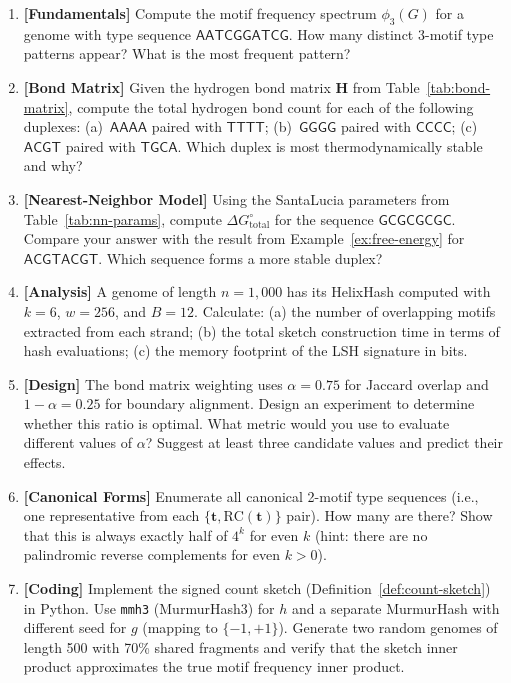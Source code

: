 \begin{enumerate}[label=\textbf{8.\arabic*.}, leftmargin=2.5em]

\item \textbf{[Fundamentals]} Compute the motif frequency spectrum $\phi_3(G)$ for a genome with type sequence $\mathsf{AATCGGATCG}$. How many distinct 3-motif type patterns appear? What is the most frequent pattern?

\item \textbf{[Bond Matrix]} Given the hydrogen bond matrix $\mathbf{H}$ from Table~\ref{tab:bond-matrix}, compute the total hydrogen bond count for each of the following duplexes: (a)~$\mathsf{AAAA}$ paired with $\mathsf{TTTT}$; (b)~$\mathsf{GGGG}$ paired with $\mathsf{CCCC}$; (c)~$\mathsf{ACGT}$ paired with $\mathsf{TGCA}$. Which duplex is most thermodynamically stable and why?

\item \textbf{[Nearest-Neighbor Model]} Using the SantaLucia parameters from Table~\ref{tab:nn-params}, compute $\Delta G^{\circ}_{\text{total}}$ for the sequence $\mathsf{GCGCGCGC}$. Compare your answer with the result from Example~\ref{ex:free-energy} for $\mathsf{ACGTACGT}$. Which sequence forms a more stable duplex?

\item \textbf{[Analysis]} A genome of length $n = 1{,}000$ has its HelixHash computed with $k = 6$, $w = 256$, and $B = 12$. Calculate: (a) the number of overlapping motifs extracted from each strand; (b) the total sketch construction time in terms of hash evaluations; (c) the memory footprint of the LSH signature in bits.

\item \textbf{[Design]} The bond matrix weighting uses $\alpha = 0.75$ for Jaccard overlap and $1 - \alpha = 0.25$ for boundary alignment. Design an experiment to determine whether this ratio is optimal. What metric would you use to evaluate different values of $\alpha$? Suggest at least three candidate values and predict their effects.

\item \textbf{[Canonical Forms]} Enumerate all canonical 2-motif type sequences (i.e., one representative from each $\{\mathbf{t}, \mathrm{RC}(\mathbf{t})\}$ pair). How many are there? Show that this is always exactly half of $4^k$ for even $k$ (hint: there are no palindromic reverse complements for even $k > 0$).

\item \textbf{[Coding]} Implement the signed count sketch (Definition~\ref{def:count-sketch}) in Python. Use \texttt{mmh3} (MurmurHash3) for $h$ and a separate MurmurHash with different seed for $g$ (mapping to $\{-1, +1\}$). Generate two random genomes of length 500 with 70\% shared fragments and verify that the sketch inner product approximates the true motif frequency inner product.


\end{enumerate}
